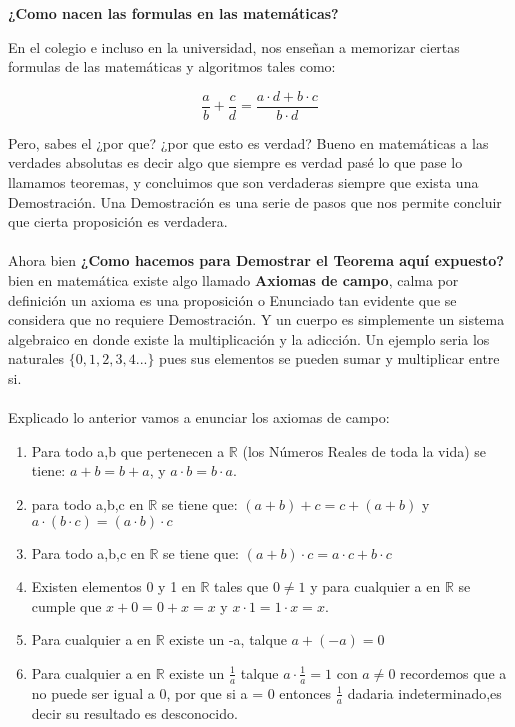 \documentclass{article}
\begin{document}
\begin{center}
    \textbf{¿Como nacen las formulas en las matemáticas?}
\end{center}
    En el colegio e incluso en la universidad, nos enseñan a memorizar ciertas formulas de las matemáticas
    y algoritmos tales como:

    \begin{equation*}
        \frac{a}{b}+\frac{c}{d}=\frac{a \cdot d + b \cdot c}{b \cdot d}
    \end{equation*}

    Pero, sabes el ¿por que? ¿por que esto es verdad? Bueno en matemáticas a las verdades
    absolutas es decir algo que siempre es verdad pasé lo que pase lo llamamos teoremas, y concluimos
    que son verdaderas siempre que exista una Demostración. Una Demostración es una serie de pasos
    que nos permite concluir que cierta proposición es verdadera.
\\
\\ 
Ahora bien \textbf{¿Como hacemos para Demostrar el Teorema aquí expuesto?} bien en matemática
existe algo llamado \textbf{Axiomas de campo}, calma por definición un axioma es una proposición o
Enunciado tan evidente que se considera que no requiere Demostración. Y un cuerpo es simplemente
un sistema algebraico en donde existe la multiplicación y la adicción. Un ejemplo seria los naturales
 $\{0,1,2,3,4...\}$ pues sus elementos se pueden sumar y multiplicar entre si.
\\
\\ 
Explicado lo anterior vamos a enunciar los axiomas de campo:
\begin{enumerate}
    \item Para todo a,b que pertenecen a $\mathbb R$ (los Números Reales de toda la vida) se tiene: 
    $a + b = b + a$, y $a \cdot b = b \cdot a$.
    \item para todo a,b,c en $\mathbb R$ se tiene que:  $(a+b)+c = c+(a+b)$ y $a \cdot (b \cdot c)= (a \cdot b) \cdot c$
    \item Para todo a,b,c en  $\mathbb R$ se tiene que: $(a + b) \cdot c = a \cdot c + b \cdot c $
    \item Existen elementos 0 y 1 en $\mathbb{R}$ tales que $0 \not = 1$ y para cualquier a en $\mathbb R$ se cumple que 
    $x + 0 = 0 + x = x$ y $x \cdot 1 = 1 \cdot x = x.$
    \item Para cualquier a en $\mathbb R$ existe un -a, talque $a+(-a)=0$
    \item Para cualquier a en $\mathbb R$ existe un $\frac{1}{a}$ talque $a \cdot \frac{1}{a} = 1$ con $ a \not = 0$ 
    recordemos que a no puede ser igual a 0, por que si a = 0 entonces $\frac{1}{a}$ dadaria indeterminado,es decir su resultado es desconocido.
\end{enumerate}
\end{document}
